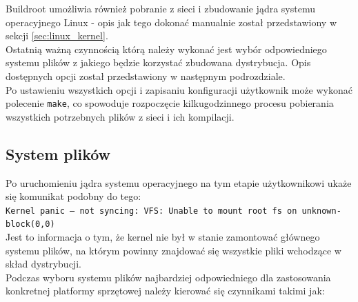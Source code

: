 \documentclass[a4paper,12pt]{book}
\begin{document}
					Buildroot umożliwia również pobranie z sieci i zbudowanie jądra systemu operacyjnego Linux - opis jak tego dokonać manualnie został przedstawiony w sekcji \ref{sec:linux_kernel}.\\
					Ostatnią ważną czynnością którą należy wykonać jest wybór odpowiedniego systemu plików z jakiego będzie korzystać zbudowana dystrybucja. Opis dostępnych opcji został przedstawiony w następnym podrozdziale.\\
					Po ustawieniu wszystkich opcji i zapisaniu konfiguracji użytkownik może wykonać polecenie \texttt{make}, co spowoduje rozpoczęcie kilkugodzinnego procesu pobierania wszystkich potrzebnych plików z sieci i ich kompilacji.
			\subsection{System plików}
				\label{sec:filesystem}
				Po uruchomieniu jądra systemu operacyjnego na tym etapie użytkownikowi ukaże się komunikat podobny do tego:\\
				\texttt{Kernel panic – not syncing: VFS: Unable to mount root fs on unknown-\\block(0,0)}\\
				Jest to informacja o tym, że kernel nie był w stanie zamontować głównego systemu plików, na którym powinny znajdować się wszystkie pliki wchodzące w skład dystrybucji.\\
				Podczas wyboru systemu plików najbardziej odpowiedniego dla zastosowania konkretnej platformy sprzętowej należy kierować się czynnikami takimi jak:
\end{document}
